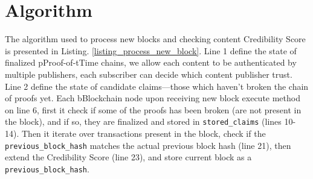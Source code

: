 \section{Algorithm}
The algorithm used to process new blocks and checking content Credibility Score is presented in Listing. \ref{listing_process_new_block}. Line 1 define the state of finalized pProof-of-tTime chains, we allow each content to be authenticated by multiple publishers, each subscriber can decide which content publisher trust. Line 2 define the state of candidate claims––those which haven't broken the chain of proofs yet. Each bBlockchain node upon receiving new block execute method on line 6, first it check if some of the proofs has been broken (are not present in the block), and if so, they are finalized and stored in \verb|stored_claims| (lines 10-14). Then it iterate over transactions present in the block, check if the \verb|previous_block_hash| matches the actual previous block hash (line 21), then extend the Credibility Score (line 23), and store current block as a \verb|previous_block_hash|.






